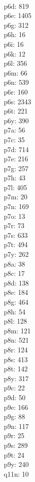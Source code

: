 \begin{multicols}{8}
  \\p6d: 819
  \\p6e: 1405
  \\p6g: 312
  \\p6h: 16
  \\p6i: 16
  \\p6k: 12
  \\p6l: 356
  \\p6m: 66
  \\p6n: 539
  \\p6r: 160
  \\p6s: 2343
  \\p6t: 221
  \\p6y: 390
  \\p7a: 56
  \\p7c: 35
  \\p7d: 714
  \\p7e: 216
  \\p7g: 257
  \\p7h: 43
  \\p7l: 405
  \\p7m: 20
  \\p7n: 169
  \\p7o: 13
  \\p7r: 73
  \\p7s: 633
  \\p7t: 494
  \\p7y: 262
  \\p8a: 38
  \\p8c: 17
  \\p8d: 138
  \\p8e: 184
  \\p8g: 464
  \\p8h: 54
  \\p8l: 128
  \\p8m: 121
  \\p8n: 521
  \\p8r: 124
  \\p8s: 413
  \\p8t: 142
  \\p8y: 317
  \\p9c: 22
  \\p9d: 50
  \\p9e: 166
  \\p9g: 88
  \\p9n: 117
  \\p9r: 25
  \\p9s: 289
  \\p9t: 24
  \\p9y: 240
  \\q11n: 10

\end{multicols}
